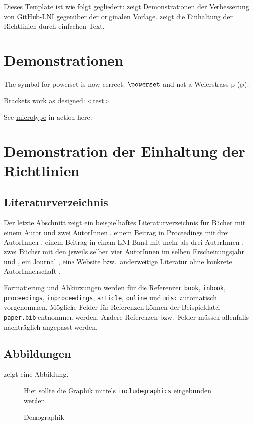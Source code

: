 \documentclass[english,utf8]{lni}
\begin{document}
Dieses Template ist wie folgt gegliedert:
 zeigt Demonstrationen der Verbesserung von GitHub-LNI gegenüber der originalen Vorlage.
 zeigt die Einhaltung der Richtlinien durch einfachen Text.

\section{Demonstrationen}
\label{sec:demos}
The symbol for powerset is now correct: $\powerset$ and not a Weierstrass p ($\wp$).

Brackets work as designed:
<test>

See \href{https://www.ctan.org/pkg/microtype}{microtype} in action here:
\blindtext

\section{Demonstration der Einhaltung der Richtlinien}
\label{sec:lniconformance}

\subsection{Literaturverzeichnis}
Der letzte Abschnitt zeigt ein beispielhaftes Literaturverzeichnis für Bücher mit einem Autor \cite{Ez10} und zwei AutorInnen \cite{AB00}, einem Beitrag in Proceedings mit drei AutorInnen \cite{ABC01}, einem Beitrag in einem LNI Band mit mehr als drei AutorInnen \cite{Az09}, zwei Bücher mit den jeweils selben vier AutorInnen im selben Erscheinungsjahr \cite{Wa14} und \cite{Wa14b}, ein Journal \cite{Gl06}, eine Website \cite{GI14} bzw.\ anderweitige Literatur ohne konkrete AutorInnenschaft \cite{XX14}.

Formatierung und Abkürzungen werden für die Referenzen \texttt{book}, \texttt{inbook}, \texttt{proceedings}, \texttt{inproceedings}, \texttt{article}, \texttt{online} und \texttt{misc} automatisch vorgenommen.
Mögliche Felder für Referenzen können der Beispieldatei \texttt{paper.bib} entnommen werden.
Andere Referenzen bzw.\ Felder müssen allenfalls nachträglich angepasst werden.

\subsection{Abbildungen}
 zeigt eine Abbildung.

\begin{figure}
  \centering
  Hier sollte die Graphik mittels \texttt{includegraphics} eingebunden werden.

  \caption{Demographik}
  \label{fig:demo}
\end{figure}
\end{document}
